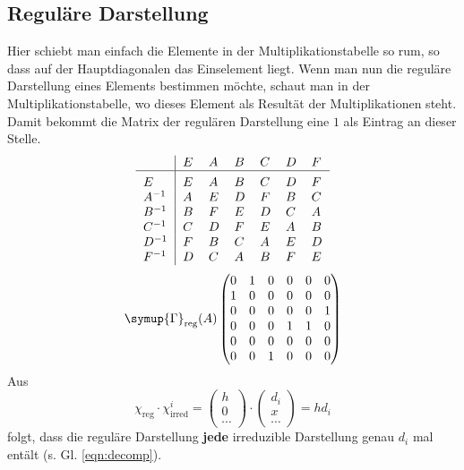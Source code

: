 \documentclass[
  captions=tableheading,  %
  titlepage=firstiscover, %
]{scrartcl}
\begin{document}
\subsection{Reguläre Darstellung}
Hier schiebt man einfach die Elemente in der Multiplikationstabelle so rum, so dass 
auf der Hauptdiagonalen das Einselement liegt. 
Wenn man nun die reguläre Darstellung eines Elements bestimmen möchte, schaut man in der 
Multiplikationstabelle, wo dieses Element als Resultät der Multiplikationen steht.
Damit bekommt die Matrix der regulären Darstellung eine $1$ als Eintrag an dieser Stelle.
\[
    \begin{tabular}{>{$}l<{$}|*{6}{>{$}l<{$}}}
    ~       & E   & A & B & C & D & F   \\
    \hline\vrule height 12pt width 0pt
    E       & E   & A & B & C & D & F\\
    A^{-1}  & A   & E & D & F & B & C\\
    B^{-1}  & B   & F & E & D & C & A\\
    C^{-1}  & C   & D & F & E & A & B\\
    D^{-1}  & F   & B & C & A & E & D\\
    F^{-1}  & D   & C & A & B & F & E\\
    \end{tabular} 
\]
\begin{equation*}
  \symup{\Gamma}_\text{reg}(A)
  \begin{pmatrix}
    0 & 1 & 0 & 0 & 0 & 0 \\
    1 & 0 & 0 & 0 & 0 & 0 \\
    0 & 0 & 0 & 0 & 0 & 1 \\
    0 & 0 & 0 & 1 & 1 & 0 \\
    0 & 0 & 0 & 0 & 0 & 0 \\
    0 & 0 & 1 & 0 & 0 & 0 
  \end{pmatrix}
\end{equation*}
Aus \begin{equation*}
  \chi_\text{reg} \cdot \chi_\text{irred}^i = 
  \begin{pmatrix}
    h \\
    0 \\
    \cdots
  \end{pmatrix}
  \cdot 
  \begin{pmatrix}
    d_i \\
    x   \\
    \cdots
  \end{pmatrix}
  = h d_i 
\end{equation*}
folgt, dass die reguläre Darstellung \textbf{jede} irreduzible Darstellung genau $d_i$ mal entält (s. Gl. \eqref{eqn:decomp}).
\end{document}
